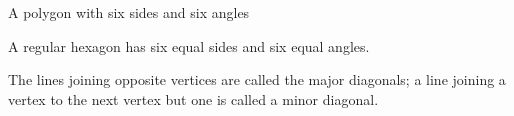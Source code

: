 A polygon with six sides and six angles  
\par
A regular hexagon has six equal sides and six equal angles.
\par
The lines joining opposite vertices are called the major diagonals;
a line joining a vertex to the next vertex but one is called a minor diagonal.